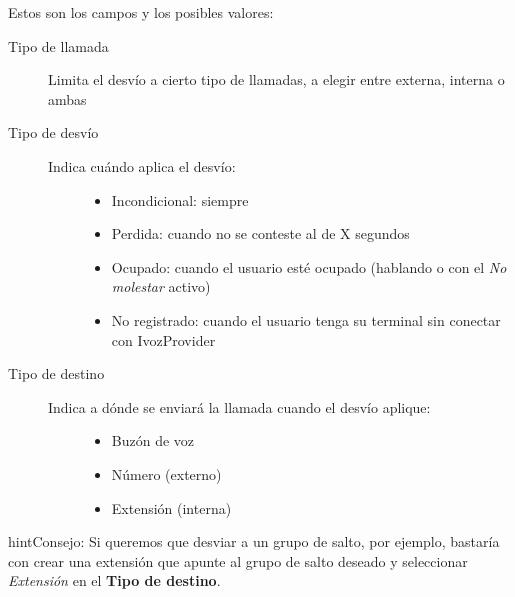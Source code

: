 \documentclass[letterpaper,10pt,spanish]{sphinxmanual}
\begin{document}
Estos son los campos y los posibles valores:
\begin{description}
\item[{Tipo de llamada}] \leavevmode{}\label{pbx_features/users:term-tipo-de-llamada}
Limita el desvío a cierto tipo de llamadas, a elegir entre externa, interna o ambas

\item[{Tipo de desvío}] \leavevmode{}\label{pbx_features/users:term-tipo-de-desvio}\begin{description}
\item[{Indica cuándo aplica el desvío:}] \leavevmode\begin{itemize}
\item {} 
Incondicional: siempre

\item {} 
Perdida: cuando no se conteste al de X segundos

\item {} 
Ocupado: cuando el usuario esté ocupado (hablando o con el \emph{No molestar} activo)

\item {} 
No registrado: cuando el usuario tenga su terminal sin conectar con IvozProvider

\end{itemize}

\end{description}

\item[{Tipo de destino}] \leavevmode{}\label{pbx_features/users:term-tipo-de-destino}\begin{description}
\item[{Indica a dónde se enviará la llamada cuando el desvío aplique:}] \leavevmode\begin{itemize}
\item {} 
Buzón de voz

\item {} 
Número (externo)

\item {} 
Extensión (interna)

\end{itemize}

\end{description}

\end{description}

\begin{notice}{hint}{Consejo:}
Si queremos que desviar a un grupo de salto, por ejemplo, bastaría con crear una extensión que apunte al grupo de salto deseado y seleccionar \emph{Extensión} en el \textbf{Tipo de destino}.
\end{notice}
\end{document}
